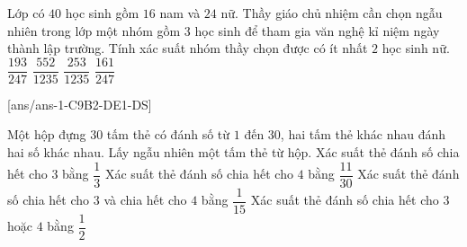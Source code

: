 \begin{ex}%
	Lớp có $40$ học sinh gồm $16$ nam và $24$ nữ. Thầy giáo chủ nhiệm cần chọn ngẫu nhiên trong lớp một nhóm gồm $3$ học sinh để tham gia văn nghệ kỉ niệm ngày thành lập trường. Tính xác suất nhóm thầy chọn được có ít nhất $2$ học sinh nữ.
	\choice
	{$\dfrac{193}{247}$}
	{$\dfrac{552}{1235}$}
	{$\dfrac{253}{1235}$}
	{\True $\dfrac{161}{247}$}
\end{ex}

[ans/ans-1-C9B2-DE1-DS]
\cauds

\begin{ex}%
	Một hộp đựng $30$ tấm thẻ có đánh số từ $1$ đến $30$, hai tấm thẻ khác nhau đánh hai số khác nhau. Lấy ngẫu nhiên một tấm thẻ từ hộp.
	\choiceTF
	{\True Xác suất thẻ đánh số chia hết cho $3$ bằng $\dfrac{1}{3}$}
	{Xác suất thẻ đánh số chia hết cho $4$ bằng $\dfrac{11}{30}$}
	{\True Xác suất thẻ đánh số chia hết cho $3$ và chia hết cho $4$ bằng $\dfrac{1}{15}$}
	{\True Xác suất thẻ đánh số chia hết cho $3$ hoặc $4$ bằng $\dfrac{1}{2}$}
\end{ex}

